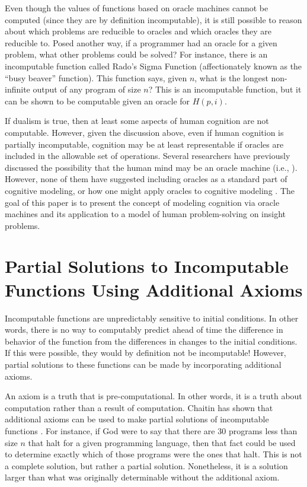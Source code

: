 Even though the values of functions based on oracle machines cannot be computed (since they are by definition incomputable), it is still possible to reason about which problems are reducible to oracles and which oracles they are reducible to.  Posed another way, if a programmer had an oracle for a given problem, what other problems could be solved?  For instance, there is an incomputable function called Rado's Sigma Function (affectionately known as the ``busy beaver'' function).  This function says, given $n$, what is the longest non-infinite output of any program of size $n$?  This is an incomputable function, but it can be shown to be computable given an oracle for $H(p, i)$.

If dualism is true, then at least some aspects of human cognition are not computable.  However, given the discussion above, even if human cognition is partially incomputable, cognition may be at least representable if oracles are included in the allowable set of operations.  Several researchers have previously discussed the possibility that the human mind may be an oracle machine (i.e., \citealp{copeland1998}).  However, none of them have suggested including oracles as a standard part of cognitive modeling, or how one might apply oracles to cognitive modeling \citep{bartlett2010a, bartlett2010b}. The goal of this paper is to present the concept of modeling cognition via oracle machines and its application to a model of human problem-solving on insight problems.

\section{Partial Solutions to Incomputable Functions Using Additional Axioms}

Incomputable functions are unpredictably sensitive to initial conditions.  In other words, there is no way to computably predict ahead of time the difference in behavior of the function from the differences in changes to the initial conditions.  If this were possible, they would by definition not be incomputable!  However, partial solutions to these functions can be made by incorporating additional axioms.

An axiom is a truth that is pre-computational.  In other words, it is a truth about computation rather than a result of computation.  Chaitin has shown that additional axioms can be used to make partial solutions of incomputable functions \citep{chaitin1982}.  For instance, if God were to say that there are 30 programs less than size $n$ that halt for a given programming language, then that fact could be used to determine exactly which of those programs were the ones that halt.  This is not a complete solution, but rather a partial solution.  Nonetheless, it is a solution larger than what was originally determinable without the additional axiom.

